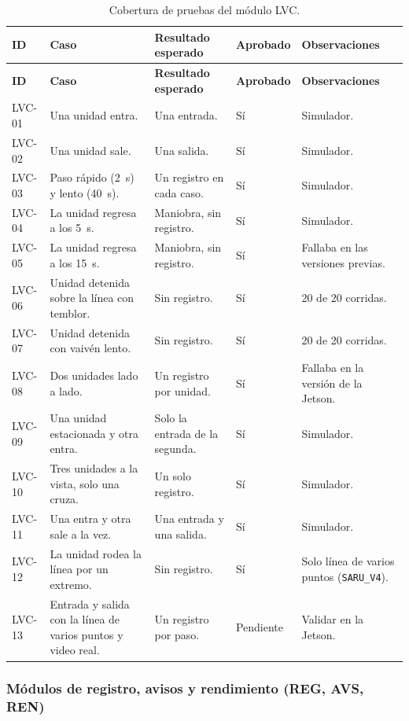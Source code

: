 {\small
\begin{longtable}{@{}L{1.3cm}L{4.3cm}L{3.8cm}C{1.4cm}L{3.2cm}@{}}
  \caption{Cobertura de pruebas del módulo LVC.}
  \label{tab:lvc} \\
  \toprule
  \textbf{ID} & \textbf{Caso} & \textbf{Resultado esperado} &
    \textbf{Aprobado} & \textbf{Observaciones} \\
  \midrule
  \endfirsthead
  \toprule
  \textbf{ID} & \textbf{Caso} & \textbf{Resultado esperado} &
    \textbf{Aprobado} & \textbf{Observaciones} \\
  \midrule
  \endhead
  LVC-01 & Una unidad entra. & Una entrada. & Sí & Simulador. \\
  LVC-02 & Una unidad sale. & Una salida. & Sí & Simulador. \\
  LVC-03 & Paso rápido (2~s) y lento (40~s). & Un registro en cada caso. &
    Sí & Simulador. \\
  LVC-04 & La unidad regresa a los 5~s. & Maniobra, sin registro. & Sí &
    Simulador. \\
  LVC-05 & La unidad regresa a los 15~s. & Maniobra, sin registro. & Sí &
    Fallaba en las versiones previas. \\
  LVC-06 & Unidad detenida sobre la línea con temblor. & Sin registro. & Sí
    & 20 de 20 corridas. \\
  LVC-07 & Unidad detenida con vaivén lento. & Sin registro. & Sí & 20 de
    20 corridas. \\
  LVC-08 & Dos unidades lado a lado. & Un registro por unidad. & Sí &
    Fallaba en la versión de la Jetson. \\
  LVC-09 & Una unidad estacionada y otra entra. & Solo la entrada de la
    segunda. & Sí & Simulador. \\
  LVC-10 & Tres unidades a la vista, solo una cruza. & Un solo registro. &
    Sí & Simulador. \\
  LVC-11 & Una entra y otra sale a la vez. & Una entrada y una salida. & Sí
    & Simulador. \\
  LVC-12 & La unidad rodea la línea por un extremo. & Sin registro. & Sí &
    Solo línea de varios puntos (\texttt{SARU\_V4}). \\
  LVC-13 & Entrada y salida con la línea de varios puntos y video real. &
    Un registro por paso. & Pendiente & Validar en la Jetson. \\
  \bottomrule
\end{longtable}
}

\subsubsection{Módulos de registro, avisos y rendimiento (REG, AVS, REN)}


